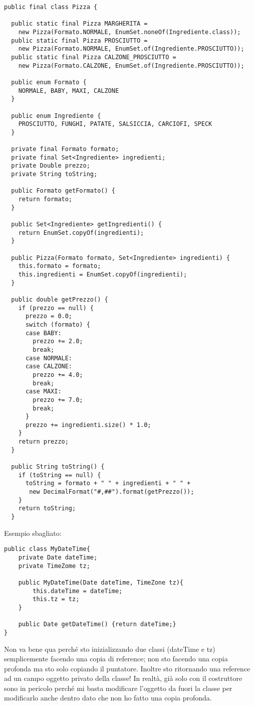 \begin{lstlisting}
public final class Pizza {
 
  public static final Pizza MARGHERITA = 
  	new Pizza(Formato.NORMALE, EnumSet.noneOf(Ingrediente.class));
  public static final Pizza PROSCIUTTO = 
  	new Pizza(Formato.NORMALE, EnumSet.of(Ingrediente.PROSCIUTTO));
  public static final Pizza CALZONE_PROSCIUTTO = 
  	new Pizza(Formato.CALZONE, EnumSet.of(Ingrediente.PROSCIUTTO));
 
  public enum Formato {
    NORMALE, BABY, MAXI, CALZONE
  }
 
  public enum Ingrediente {
    PROSCIUTTO, FUNGHI, PATATE, SALSICCIA, CARCIOFI, SPECK
  }
 
  private final Formato formato;
  private final Set<Ingrediente> ingredienti;
  private Double prezzo;
  private String toString;
 
  public Formato getFormato() {
    return formato;
  }
 
  public Set<Ingrediente> getIngredienti() {
    return EnumSet.copyOf(ingredienti);
  }
 
  public Pizza(Formato formato, Set<Ingrediente> ingredienti) {
    this.formato = formato;
    this.ingredienti = EnumSet.copyOf(ingredienti);
  }
 
  public double getPrezzo() {
    if (prezzo == null) {
      prezzo = 0.0;
      switch (formato) {
      case BABY:
        prezzo += 2.0;
        break;
      case NORMALE:
      case CALZONE:
        prezzo += 4.0;
        break;
      case MAXI:
        prezzo += 7.0;
        break;
      }
      prezzo += ingredienti.size() * 1.0;
    }
    return prezzo;
  }
 
  public String toString() {
    if (toString == null) {
      toString = formato + " " + ingredienti + " " +
       new DecimalFormat("#,##").format(getPrezzo());
    }
    return toString;
  }
\end{lstlisting}

Esempio sbagliato:
\begin{lstlisting}
public class MyDateTime{
	private Date dateTime;
	private TimeZome tz;

	public MyDateTime(Date dateTime, TimeZone tz){
		this.dateTime = dateTime;
		this.tz = tz;
	}

	public Date getDateTime() {return dateTime;}
}
\end{lstlisting}
Non va bene qua perché sto inizializzando due classi (dateTime e tz) semplicemente facendo una copia di reference; non sto facendo una copia profonda ma sto solo copiando il puntatore. Inoltre sto ritornando una reference ad un campo oggetto privato della classe! In realtà, già solo con il costruttore sono in pericolo perché mi basta modificare l’oggetto da fuori la classe per modificarlo anche dentro dato che non ho fatto una copia profonda.

